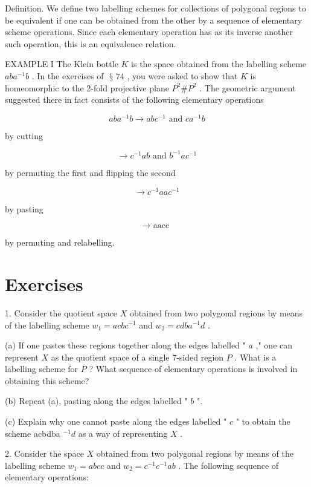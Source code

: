\documentclass[10pt]{article}
\begin{document}
Definition. We define two labelling schemes for collections of polygonal regions to be equivalent if one can be obtained from the other by a sequence of elementary scheme operations. Since each elementary operation has as its inverse another such operation, this is an equivalence relation.

EXAMPLE I The Klein bottle \(K\) is the space obtained from the labelling scheme \({ab}{a}^{-1}b\) . In the exercises of \(\text{ § }{74}\) , you were asked to show that \(K\) is homeomorphic to the 2-fold projective plane \({P}^{2}\# {P}^{2}\) . The geometric argument suggested there in fact consists of the following elementary operations

\[
{ab}{a}^{-1}b \rightarrow  {ab}{c}^{-1}\text{ and }c{a}^{-1}b
\]

by cutting

\[
\rightarrow  {c}^{-1}{ab}\text{ and }{b}^{-1}a{c}^{-1}
\]

by permuting the first and flipping the second

\[
\rightarrow  {c}^{-1}{aa}{c}^{-1}
\]

by pasting

\[
\rightarrow  \text{ aacc }
\]

by permuting and relabelling.

\section*{Exercises}

1. Consider the quotient space \(X\) obtained from two polygonal regions by means of the labelling scheme \({w}_{1} = {acb}{c}^{-1}\) and \({w}_{2} = {cdb}{a}^{-1}d\) .

(a) If one pastes these regions together along the edges labelled " \(a\) ," one can represent \(X\) as the quotient space of a single 7-sided region \(P\) . What is a labelling scheme for \(P\) ? What sequence of elementary operations is involved in obtaining this scheme?

(b) Repeat (a), pasting along the edges labelled " \(b\) ".

(c) Explain why one cannot paste along the edges labelled " \(c\) " to obtain the scheme acbdba \({}^{-1}d\) as a way of representing \(X\) .

2. Consider the space \(X\) obtained from two polygonal regions by means of the labelling scheme \({w}_{1} = {abcc}\) and \({w}_{2} = {c}^{-1}{c}^{-1}{ab}\) . The following sequence of elementary operations:
\end{document}
